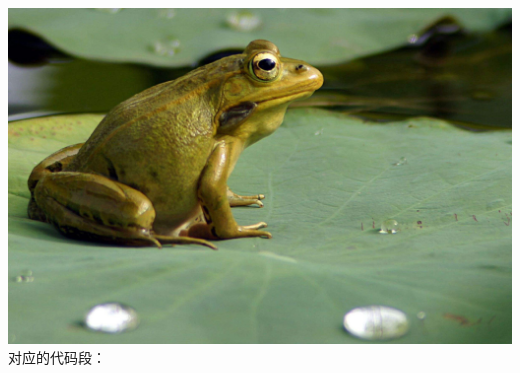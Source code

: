 \documentclass[10pt, a4paper]{article}
\begin{document}
    \includegraphics[scale = .1]{6sobel.jpg}
    对应的代码段：
\end{document}
